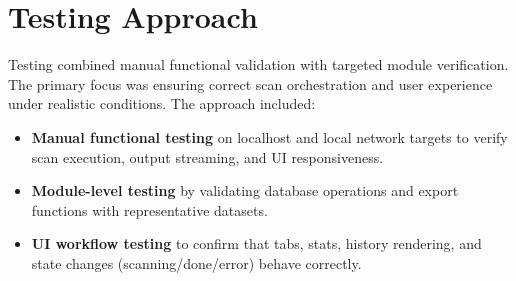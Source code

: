 \documentclass[12pt, a4paper]{report}
\begin{document}
\section{Testing Approach}
Testing combined manual functional validation with targeted module verification. The primary focus was ensuring correct scan orchestration and user experience under realistic conditions. The approach included:
\begin{itemize}[leftmargin=2.2em]
  \item \textbf{Manual functional testing} on localhost and local network targets to verify scan execution, output streaming, and UI responsiveness.
  \item \textbf{Module-level testing} by validating database operations and export functions with representative datasets.
  \item \textbf{UI workflow testing} to confirm that tabs, stats, history rendering, and state changes (scanning/done/error) behave correctly.
\end{itemize}
\end{document}
